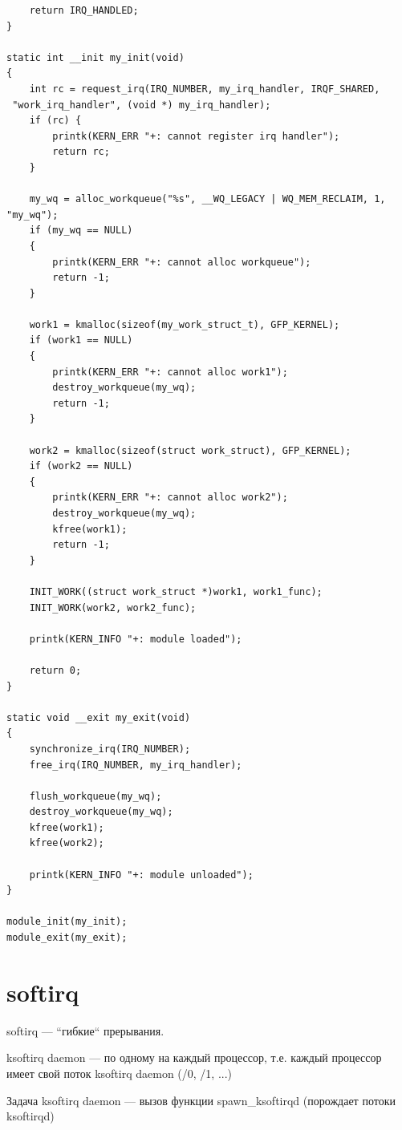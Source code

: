 \begin{lstlisting}
    return IRQ_HANDLED;
}

static int __init my_init(void)
{
    int rc = request_irq(IRQ_NUMBER, my_irq_handler, IRQF_SHARED,
 "work_irq_handler", (void *) my_irq_handler);
    if (rc) {
        printk(KERN_ERR "+: cannot register irq handler");
        return rc;
    }

    my_wq = alloc_workqueue("%s", __WQ_LEGACY | WQ_MEM_RECLAIM, 1, "my_wq");
    if (my_wq == NULL)
    {
        printk(KERN_ERR "+: cannot alloc workqueue");
        return -1;
    }

    work1 = kmalloc(sizeof(my_work_struct_t), GFP_KERNEL);
    if (work1 == NULL)
    {
        printk(KERN_ERR "+: cannot alloc work1");
        destroy_workqueue(my_wq);
        return -1;
    }

    work2 = kmalloc(sizeof(struct work_struct), GFP_KERNEL);
    if (work2 == NULL)
    {
        printk(KERN_ERR "+: cannot alloc work2");
        destroy_workqueue(my_wq);
        kfree(work1);
        return -1;
    }

    INIT_WORK((struct work_struct *)work1, work1_func);
    INIT_WORK(work2, work2_func);
    
    printk(KERN_INFO "+: module loaded");

    return 0;
}

static void __exit my_exit(void)
{
    synchronize_irq(IRQ_NUMBER);
    free_irq(IRQ_NUMBER, my_irq_handler);

    flush_workqueue(my_wq);
    destroy_workqueue(my_wq);
    kfree(work1);
    kfree(work2);
    
    printk(KERN_INFO "+: module unloaded");
}

module_init(my_init);
module_exit(my_exit);

\end{lstlisting}

\section{softirq}

softirq --- ``гибкие`` прерывания.

ksoftirq daemon --- по одному на каждый процессор, т.е. каждый процессор имеет свой поток ksoftirq daemon (/0, /1, ...)

Задача ksoftirq daemon --- вызов функции spawn\_ksoftirqd (порождает потоки ksoftirqd)

